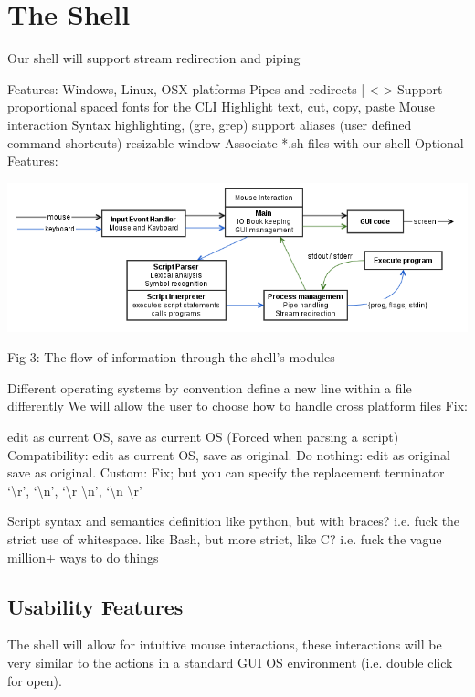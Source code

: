 \documentclass[a4paper,11pt]{article}
\begin{document}
\section{The Shell}

Our shell will support stream redirection and piping

Features:
Windows, Linux, OSX platforms
Pipes and redirects | < >
Support proportional spaced fonts for the CLI
Highlight text, cut, copy, paste
Mouse interaction
Syntax highlighting, (gre, grep)
support aliases (user defined command shortcuts)
resizable window
Associate *.sh files with our shell
Optional Features:

\begin{center}\includegraphics[width=16cm]{shellflow.png}

Fig 3: The flow of information through the shell's modules\end{center}

Different operating systems by convention define a new line within a file differently
We will allow the user to choose how to handle cross platform files
Fix:	

edit as current OS, save as current OS (Forced when parsing a script)
Compatibility: 	
edit as current OS, save as original.
Do nothing: 	 edit as original save as original.
Custom: 	
Fix; but you can specify the replacement terminator {‘\textbackslash r’, ‘\textbackslash n’, ‘\textbackslash r \textbackslash n’, ‘\textbackslash n \textbackslash r’}

Script syntax and semantics definition
like python, but with braces? i.e. fuck the strict use of whitespace.
like Bash, but more strict, like C? i.e. fuck the vague million+ ways to do things







\subsection*{Usability Features}
The shell will allow for intuitive mouse interactions, these interactions will be very similar to the actions in a standard GUI OS environment (i.e. double click for open).
\end{document}
